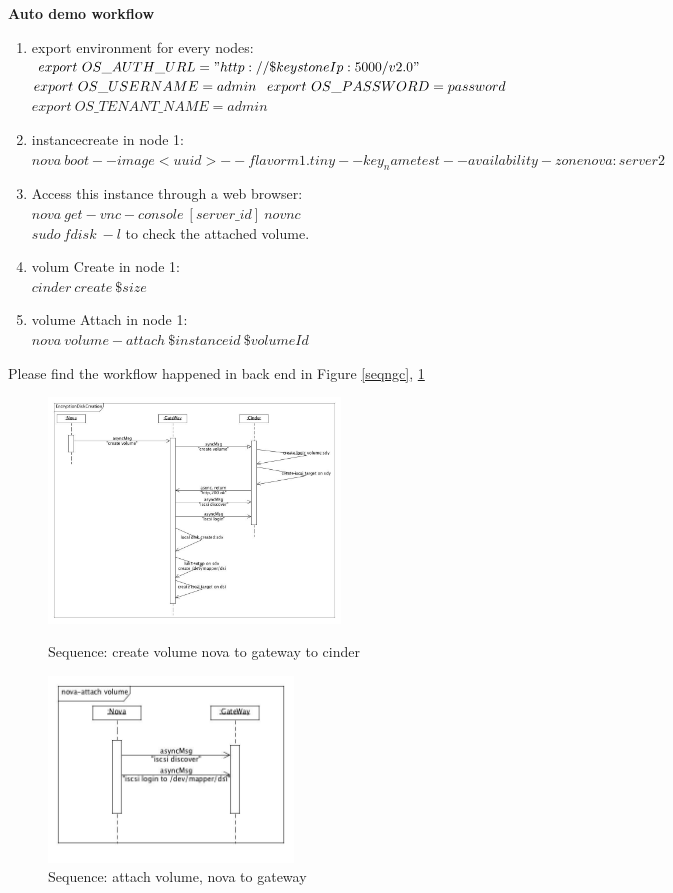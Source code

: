 \documentclass[10pt]{report}
\begin{document}
			\textbf{Auto demo workflow}
			\begin{enumerate}
			\item export environment for every nodes: \\
			$export\  OS\_AUTH\_URL="http://\$keystoneIp:5000/v2.0" \\$
			$export\ OS\_USERNAME=admin \\$
			$export\ OS\_PASSWORD=password \\$
			$export\ OS\_TENANT\_NAME=admin$
			
			\item instancecreate in node 1:\\
			$nova\ boot --image <uuid> --flavor m1.tiny --key_name test --availability-zone nova:server2$
			
			\item Access this instance through a web browser:\\
			$nova\ get-vnc-console\ [server\_id]\ novnc$\\
			$sudo\ fdisk\ -l$ to check the attached volume.
						
			\item volum Create in node 1:\\
			$cinder\ create\ \$size$
			
			\item volume Attach in node 1:\\
			$nova\ volume-attach\ \$instanceid\ \$volumeId $\\
			\end{enumerate}
			
			Please find the workflow happened in back end in Figure \ref{seqngc}, \ref{seqng}
			\begin{figure}[!fhtbp]
				\centering
				\includegraphics[width=\textwidth,height=170pt,keepaspectratio] {sequence(nova-gw-cinder)}
				\caption{Sequence: create volume nova to gateway to cinder}
				\label{seqngc}
				\includegraphics[width=\textwidth,height=140pt,keepaspectratio] {sequence(nova-attach-gw)}
				\caption{Sequence: attach volume, nova to gateway}
				\label{seqng}
			\end{figure}		
			\newpage
\end{document}
